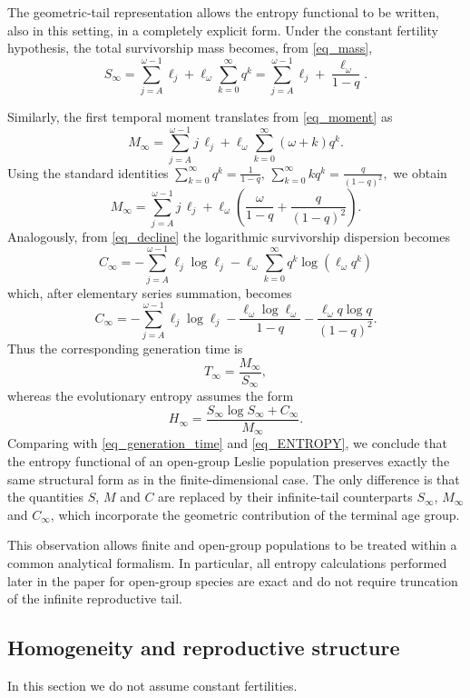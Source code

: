 \documentclass[10pt,a4paper]{amsart}
\theoremstyle{definition}
\theoremstyle{remark}
\numberwithin{equation}{section}
\begin{document}
The geometric-tail representation allows the entropy functional to be written, also in this setting, in a completely explicit form.
Under the constant fertility hypothesis, the total survivorship mass becomes, from \eqref{eq_mass},
\[
S_\infty
=
\sum_{j=A}^{\omega-1} \ell_j
+
\ell_\omega
\sum_{k=0}^{\infty}q^k
=
\sum_{j=A}^{\omega-1} \ell_j
+
\frac{\ell_\omega}{1-q}.
\]

\noindent Similarly, the first temporal moment translates from \eqref{eq_moment}  as 
\[
M_\infty
=
\sum_{j=A}^{\omega-1} j\,\ell_j
+
\ell_\omega
\sum_{k=0}^{\infty}
(\omega+k)q^k.
\]
Using the standard identities
$
\sum_{k=0}^{\infty}q^k
=
\frac{1}{1-q},
\, 
\sum_{k=0}^{\infty}kq^k
=
\frac{q}{(1-q)^2},
$
we obtain
\[
M_\infty
=
\sum_{j=A}^{\omega-1} j\,\ell_j
+
\ell_\omega
\left(
\frac{\omega}{1-q}
+
\frac{q}{(1-q)^2}
\right).
\]
Analogously, from \eqref{eq_decline} the logarithmic survivorship dispersion becomes
\[
C_\infty
=
-\sum_{j=A}^{\omega-1}
\ell_j\log\ell_j
-
\ell_\omega
\sum_{k=0}^{\infty}
q^k
\log(\ell_\omega q^k)
\]
which, after elementary series summation, becomes
\[
C_\infty
=
-\sum_{j=A}^{\omega-1}
\ell_j\log\ell_j
-
\frac{\ell_\omega\log\ell_\omega}{1-q}
-
\frac{\ell_\omega q\log q}
{(1-q)^2}.
\]
Thus the corresponding generation time is 
\[
T_\infty
=
\frac{M_\infty}{S_\infty},
\]
whereas the evolutionary entropy assumes the form
\[
H_\infty
=
\frac{
S_\infty\log S_\infty
+
C_\infty
}
{
M_\infty
}.
\]
Comparing with \eqref{eq_generation_time} and \eqref{eq_ENTROPY}, we conclude that 
the entropy functional of an open-group Leslie
population preserves exactly the same structural form as in the
finite-dimensional case. The only difference is that the quantities
\(S\), \(M\) and \(C\) are replaced by their infinite-tail
counterparts \(S_\infty\), \(M_\infty\) and \(C_\infty\), which
incorporate the geometric contribution of the terminal age group.

This observation allows finite and open-group populations to be
treated within a common analytical formalism. In particular, all
entropy calculations performed later in the paper for open-group
species are exact and do not require truncation of the infinite
reproductive tail.



\subsection{Homogeneity and reproductive structure}
In this section we do not assume constant fertilities.
\end{document}
